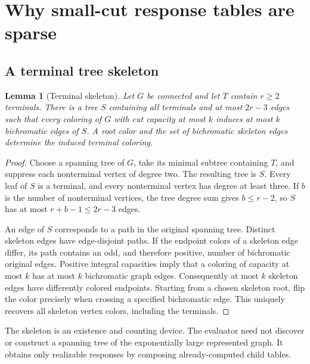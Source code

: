 \documentclass[11pt,a4paper]{article}
\newtheorem{lemma}[theorem]{Lemma}
\theoremstyle{definition}
\theoremstyle{remark}
\begin{document}
\section{Why small-cut response tables are sparse}
\label{sec:sparsity}
\subsection{A terminal tree skeleton}
\begin{lemma}[Terminal skeleton]
\label{lem:skeleton}
Let $G$ be connected and let $T$ contain $r\ge2$ terminals. There is a tree $S$ containing all terminals and at most $2r-3$ edges such that every coloring of $G$ with cut capacity at most $k$ induces at most $k$ bichromatic edges of $S$. A root color and the set of bichromatic skeleton edges determine the induced terminal coloring.
\end{lemma}
\begin{proof}
Choose a spanning tree of $G$, take its minimal subtree containing $T$, and suppress each nonterminal vertex of degree two. The resulting tree is $S$. Every leaf of $S$ is a terminal, and every nonterminal vertex has degree at least three. If $b$ is the number of nonterminal vertices, the tree degree sum gives $b\le r-2$, so $S$ has at most $r+b-1\le2r-3$ edges.

An edge of $S$ corresponds to a path in the original spanning tree. Distinct skeleton edges have edge-disjoint paths. If the endpoint colors of a skeleton edge differ, its path contains an odd, and therefore positive, number of bichromatic original edges. Positive integral capacities imply that a coloring of capacity at most $k$ has at most $k$ bichromatic graph edges. Consequently at most $k$ skeleton edges have differently colored endpoints. Starting from a chosen skeleton root, flip the color precisely when crossing a specified bichromatic edge. This uniquely recovers all skeleton vertex colors, including the terminals.
\end{proof}

The skeleton is an existence and counting device. The evaluator need not discover or construct a spanning tree of the exponentially large represented graph. It obtains only realizable responses by composing already-computed child tables.
\end{document}
